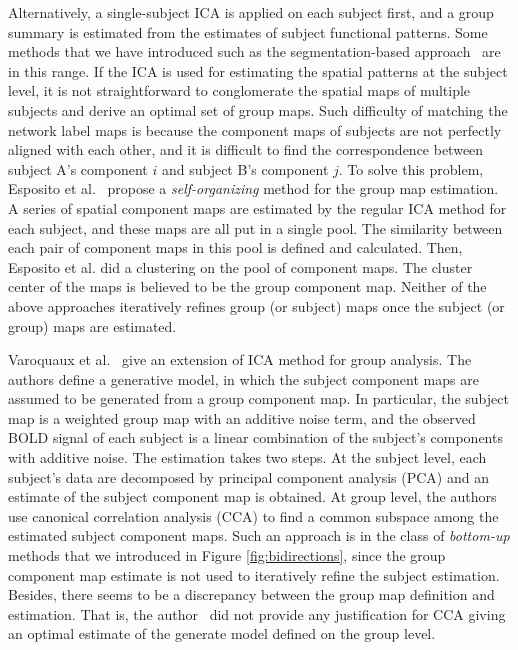Alternatively, a single-subject ICA is applied on each subject first, and a
group summary is estimated from the estimates of subject functional
patterns. Some methods that we have introduced such as the segmentation-based
approach~\cite{bellec2010multi,craddock2012whole} are in this range. If the ICA
is used for estimating the spatial patterns at the subject level, it is not
straightforward to conglomerate the spatial maps of multiple subjects and derive
an optimal set of group maps. Such difficulty of matching the network label maps
is because the component maps of subjects are not perfectly aligned with each
other, and it is difficult to find the correspondence between subject A's
component $i$ and subject B's component $j$. To solve this problem, Esposito et
al.~\cite{esposito2005independent} propose a \emph{self-organizing} method for
the group map estimation. A series of spatial component maps are estimated by
the regular ICA method for each subject, and these maps are all put in a single
pool. The similarity between each pair of component maps in this pool is defined
and calculated. Then, Esposito et al.  did a clustering on the pool of component
maps. The cluster center of the maps is believed to be the group component
map. Neither of the above approaches iteratively refines group (or subject) maps
once the subject (or group) maps are estimated.

Varoquaux et al.~\cite{varoquaux2010group} give an extension of ICA method for
group analysis. The authors define a generative model, in which the subject
component maps are assumed to be generated from a group component map. In
particular, the subject map is a weighted group map with an additive noise
term, and the observed BOLD signal of each subject is a linear combination of
the subject's components with additive noise. The estimation takes two
steps. At the subject level, each subject's data are decomposed by principal
component analysis (PCA) and an estimate of the subject component map is
obtained. At group level, the authors use canonical correlation analysis (CCA)
to find a common subspace among the estimated subject component maps. Such an
approach is in the class of \emph{bottom-up} methods that we introduced in
Figure \ref{fig:bidirections}, since the group component map estimate is not
used to iteratively refine the subject estimation. Besides, there seems to be
a discrepancy between the group map definition and estimation. That is, the
author~\cite{varoquaux2010group} did not provide any justification for CCA
giving an optimal estimate of the generate model defined on the group level.

